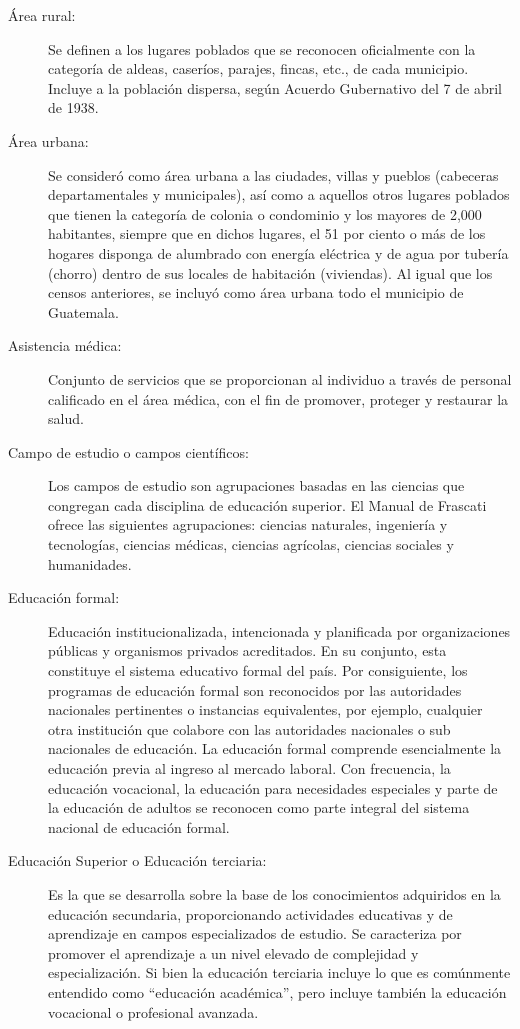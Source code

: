 \begin{description}
\item[Área rural:   ] Se definen a los lugares poblados que se reconocen oficialmente con la categoría de aldeas, caseríos, parajes, fincas, etc., de cada municipio. Incluye a la población dispersa, según Acuerdo Gubernativo del 7 de abril de 1938. 
\item[Área urbana:  ] Se consideró como área urbana a las ciudades, villas y pueblos (cabeceras departamentales y municipales), así como a aquellos otros lugares poblados que tienen la categoría de colonia o condominio y los mayores de 2,000 habitantes, siempre que en dichos lugares, el 51 por ciento o más de los hogares disponga de alumbrado con energía eléctrica y de agua por tubería (chorro) dentro de sus locales de habitación (viviendas). Al igual que los censos anteriores, se incluyó como área urbana todo el municipio de Guatemala. 
\item[Asistencia médica: ] Conjunto de servicios que se proporcionan al individuo a través de personal calificado en el área médica, con el fin de promover, proteger y restaurar la salud.
\item[Campo de estudio o campos científicos: ] Los campos de estudio son agrupaciones basadas en las ciencias que congregan cada disciplina de educación superior. El Manual de Frascati ofrece las siguientes agrupaciones: ciencias naturales, ingeniería y tecnologías, ciencias médicas, ciencias agrícolas, ciencias sociales y humanidades.
\item[Educación formal: ] Educación institucionalizada, intencionada y planificada por organizaciones públicas y organismos privados acreditados. En su conjunto, esta constituye el sistema educativo formal del país. Por consiguiente, los programas de educación formal son reconocidos por las autoridades nacionales pertinentes o instancias equivalentes, por ejemplo, cualquier otra institución que colabore con las autoridades nacionales o sub nacionales de educación. La educación formal comprende esencialmente la educación previa al ingreso al mercado laboral. Con frecuencia, la educación vocacional, la educación para necesidades especiales y parte de la educación de adultos se reconocen como parte integral del sistema nacional de educación formal.
\item[Educación Superior o Educación terciaria: ] Es la que se desarrolla sobre la base de los conocimientos adquiridos en la educación secundaria, proporcionando actividades educativas y de aprendizaje en campos especializados de estudio. Se caracteriza por promover el aprendizaje a un nivel elevado de complejidad y especialización. Si bien la educación terciaria incluye lo que es comúnmente entendido como “educación académica”, pero incluye también la educación vocacional o profesional avanzada.

\end{description}
